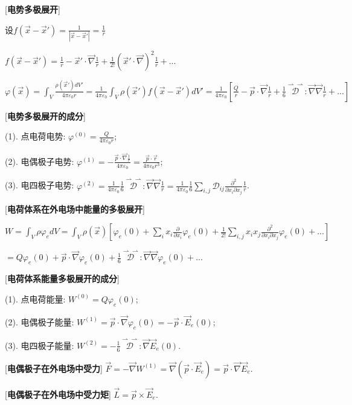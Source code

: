 [\textbf{电势多极展开}] \par
\qquad 设$f(\vec x-\vec x')=\frac{1}{|\vec x-\vec x'|}=\frac{1}{r}$\par
\qquad \quad $f(\vec x-\vec x')=\frac{1}{r}-\vec x'\cdot\vec\nabla \frac{1}{r}+\frac{1}{2!}(\vec x'\cdot\vec\nabla)^2\frac{1}{r}+...$\par
\qquad $\varphi(\vec x)=\int_V\frac{\rho(\vec x')dV'}{4\pi\varepsilon_0r}=\frac{1}{4\pi\varepsilon_0}\int_V\rho(\vec x')f(\vec x-\vec x')dV'=\frac{1}{4\pi\varepsilon_0}\left[\frac{Q}{r}-\vec p\cdot\vec \nabla\frac{1}{r}+\frac{1}{6}\overset{\rightharpoonup\!\!\!\! \rightharpoonup}{\mathscr{D}}:\vec\nabla\vec\nabla\frac{1}{r}+...\right]$\par

\clearpage

[\textbf{电势多极展开的成分}]\par
\qquad (1). 点电荷电势: $\varphi^{(0)}=\frac{Q}{4\pi\varepsilon_0 r}$;\par
\qquad (2). 电偶极子电势: $\varphi^{(1)}=-\frac{\vec p\cdot\vec\nabla\frac{1}{r}}{4\pi\varepsilon_0}=\frac{\vec p\cdot\vec r}{4\pi\varepsilon_0r^3}$;\par
\qquad (3). 电四极子电势: $\varphi^{(2)}=\frac{1}{4\pi\varepsilon_0}\frac{1}{6}\overset{\rightharpoonup\!\!\!\! \rightharpoonup}{\mathscr{D}}:\vec\nabla\vec\nabla\frac{1}{r}=\frac{1}{4\pi\varepsilon_0}\frac{1}{6}\sum\limits_{i,j}\mathscr{D}_{ij}\frac{\partial^2}{\partial x_i\partial x_j}\frac{1}{r}$.\par

[\textbf{电荷体系在外电场中能量的多极展开}] \par
\qquad $W=\int_V\rho\varphi_edV=\int_V\rho(\vec x)\left[\varphi_e(0)+\sum\limits_i x_i\frac{\partial }{\partial x_i}\varphi_e(0)+\frac{1}{2!}\sum\limits_{i,j}x_ix_j\frac{\partial^2}{\partial x_i\partial x_j}\varphi_e(0)+...\right]$\par
\qquad \quad $=Q\varphi_e(0)+\vec p\cdot\vec\nabla\varphi_e(0)+\frac{1}{6}\overset{\rightharpoonup\!\!\!\! \rightharpoonup}{\mathscr{D}}:\vec\nabla\vec\nabla\varphi_e(0)+...$\par

[\textbf{电荷体系能量多极展开的成分}]\par
\qquad (1). 点电荷能量: $W^{(0)}=Q\varphi_e(0)$;\par
\qquad (2). 电偶极子能量: $W^{(1)}=\vec p\cdot\vec \nabla\varphi_e(0)=-\vec p\cdot\vec E_e(0)$;\par
\qquad (3). 电四极子能量: $W^{(2)}=-\frac{1}{6}\overset{\rightharpoonup\!\!\!\! \rightharpoonup}{\mathscr{D}}:\vec\nabla\vec E_e(0)$.\par

[\textbf{电偶极子在外电场中受力}] $\vec F=-\vec\nabla W^{(1)}=\vec\nabla(\vec p\cdot\vec E_e)=\vec p\cdot\vec \nabla\vec E_e$.\par

[\textbf{电偶极子在外电场中受力矩}] $\vec L=\vec p\times\vec E_e$.\par


